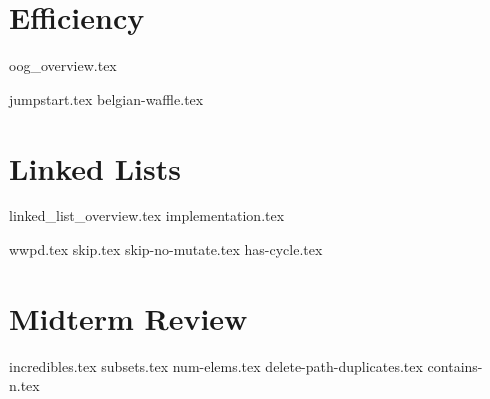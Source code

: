 \documentclass{exam}
\begin{document}
\section{Efficiency}
{oog_overview.tex}
\begin{questions}
{jumpstart.tex}
{belgian-waffle.tex}
\end{questions}

\section{Linked Lists}
{linked_list_overview.tex}
{implementation.tex}
\newpage
\begin{questions}
{wwpd.tex}
\newpage
{skip.tex}
{skip-no-mutate.tex}
{has-cycle.tex}
\end{questions}

\newpage
\section{Midterm Review}
\begin{questions}
{incredibles.tex}
{subsets.tex}
\newpage
{num-elems.tex}
\newpage
{delete-path-duplicates.tex}
{contains-n.tex}
\end{questions}
\end{document}
